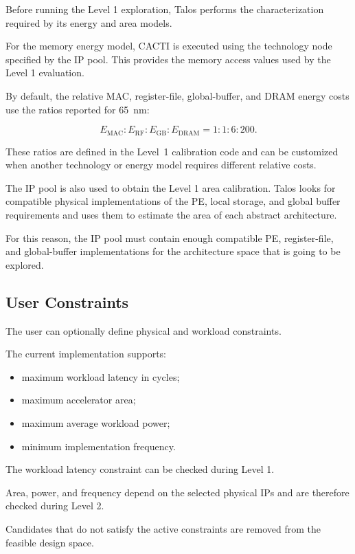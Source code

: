 Before running the Level 1 exploration, Talos performs the
characterization required by its energy and area models.

For the memory energy model, CACTI is executed using the technology
node specified by the IP pool. This provides the memory access values
used by the Level 1 evaluation.

By default, the relative MAC, register-file, global-buffer, and DRAM
energy costs use the ratios reported for 65~nm:

\[
E_{\mathrm{MAC}} : E_{\mathrm{RF}} : E_{\mathrm{GB}} :
E_{\mathrm{DRAM}} = 1 : 1 : 6 : 200.
\]

These ratios are defined in the Level~1 calibration code and can be
customized when another technology or energy model requires different
relative costs.

The IP pool is also used to obtain the Level 1 area calibration. Talos
looks for compatible physical implementations of the PE, local
storage, and global buffer requirements and uses them to estimate the
area of each abstract architecture.

For this reason, the IP pool must contain enough compatible PE,
register-file, and global-buffer implementations for the architecture
space that is going to be explored.


\subsection{User Constraints}

The user can optionally define physical and workload constraints.

The current implementation supports:

\begin{itemize}
    \item maximum workload latency in cycles;
    \item maximum accelerator area;
    \item maximum average workload power;
    \item minimum implementation frequency.
\end{itemize}

The workload latency constraint can be checked during Level 1.

Area, power, and frequency depend on the selected physical IPs and are
therefore checked during Level 2.

Candidates that do not satisfy the active constraints are removed from
the feasible design space.


